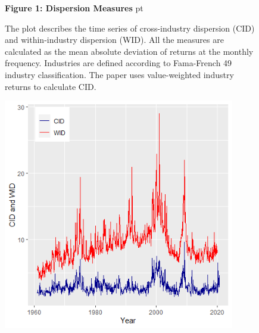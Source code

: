 \documentclass[12pt]{article}
\begin{document}
\begin{figure}[h!]
\textbf{Figure 1: Dispersion Measures}
 pt
\begin{flushleft}
{The plot describes the time series of cross-industry dispersion (CID) and within-industry dispersion (WID). All the measures are calculated as the mean absolute deviation of returns at the monthly frequency. Industries are defined according to Fama-French 49 industry classification. The paper uses value-weighted industry returns to calculate CID.}
\end{flushleft}
\centering
\vspace{0.64cm}
\includegraphics[width=0.9\textwidth]{cid_wid_t.png}
\end{figure}
\end{document}

